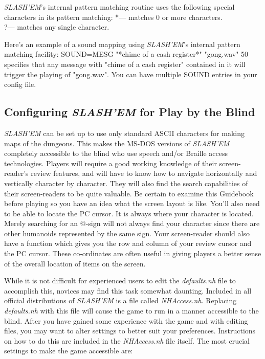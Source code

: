 {\it SLASH'EM\/}'s internal pattern matching routine uses the following
special characters in its pattern matching:
  *--- matches 0 or more characters.\\
  ?--- matches any single character.

Here's an example of a sound mapping using {\it SLASH'EM\/}'s internal
pattern matching facility:
    SOUND=MESG "*chime of a cash register*" "gong.wav" 50
specifies that any message with "chime of a cash register" contained
in it will trigger the playing of "gong.wav".  You can have multiple
SOUND entries in your config file.

\subsection*{Configuring {\it SLASH'EM\/} for Play by the Blind}


{\it SLASH'EM\/} can be set up to use only standard ASCII characters for making
maps of the dungeons. This makes the MS-DOS versions of {\it SLASH'EM\/} completely
accessible to the blind who use speech and/or Braille access technologies.
Players will require a good working knowledge of their screen-reader's
review features, and will have to know how to navigate horizontally and
vertically character by character. They will also find the search
capabilities of their screen-readers to be quite valuable. Be certain to
examine this Guidebook before playing so you have an idea what the screen
layout is like. You'll also need to be able to locate the PC cursor. It is
always where your character is located. Merely searching for an @-sign will
not always find your character since there are other humanoids represented
by the same sign. Your screen-reader should also have a function which
gives you the row and column of your review cursor and the PC cursor.
These co-ordinates are often useful in giving players a better sense of the
overall location of items on the screen.

While it is not difficult for experienced users to edit the {\it defaults.nh\/}
file to accomplish this, novices may find this task somewhat daunting.
Included in all official distributions of {\it SLASH'EM\/} is a file called
{\it NHAccess.nh}.  Replacing {\it defaults.nh\/} with this file will cause
the game to run in a manner accessible to the blind. After you have gained
some experience with the game and with editing files, you may want to alter
settings to better suit your preferences. Instructions on how to do this
are included in the {\it NHAccess.nh\/} file itself. The most crucial settings to
make the game accessible are:


